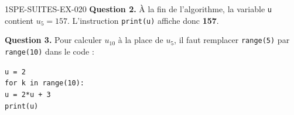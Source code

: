 \begin{corrige}{1SPE-SUITES-EX-020}
\textbf{Question 2.} À la fin de l'algorithme, la variable \texttt{u} contient $u_5 = 157$. L'instruction \texttt{print(u)} affiche donc \textbf{157}.


\textbf{Question 3.} Pour calculer $u_{10}$ à la place de $u_5$, il faut remplacer \texttt{range(5)} par \texttt{range(10)} dans le code :

\begin{center}
\texttt{u = 2}\\
\texttt{for k in range(10):}\\
\texttt{\quad\quad u = 2*u + 3}\\
\texttt{print(u)}
\end{center}

\end{corrige}
